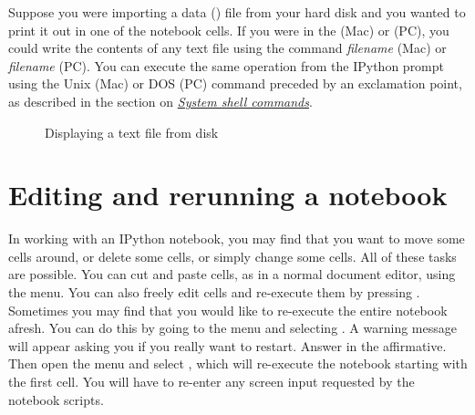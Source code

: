 \documentclass[letterpaper,10pt,english]{sphinxmanual}
\begin{document}
Suppose you were importing a data () file from your hard disk and you wanted to print it out in one of the notebook cells.  If you were in the  (Mac) or  (PC), you could write the contents of any text file using the command  \emph{filename} (Mac) or  \emph{filename} (PC).  You can execute the same operation from the IPython prompt using the Unix (Mac) or DOS (PC) command preceded by an exclamation point, as described in the section on {\hyperref[chap2/chap2_basics:syscommands]{\emph{System shell commands}}}.
\begin{figure}[htbp]
\centering
\capstart

\caption{Displaying a text file from disk}\label{apdx2/apdx2_ipynb:fig-ipynotefinalbottom}\end{figure}


\section{Editing and rerunning a notebook}
\label{apdx2/apdx2_ipynb:editing-and-rerunning-a-notebook}
In working with an IPython notebook, you may find that you want to move some cells around, or delete some cells, or simply change some cells.  All of these tasks are possible.  You can  cut and paste cells, as in a normal document editor, using the  menu.  You can also freely edit cells and re-execute them by  pressing .  Sometimes you may find that you would like to re-execute the entire notebook afresh.  You can do this by going to the  menu and selecting .  A warning message will appear asking you if you really want to restart.  Answer in the affirmative.  Then open the  menu and select , which will re-execute the notebook starting with the first cell.  You will have to re-enter any screen input requested by the notebook scripts.
\end{document}
